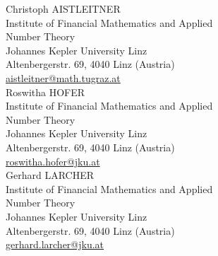 \documentclass[10pt]{article}
\newcommand{\1}{\mathbf{1}}
\begin{document}
Christoph AISTLEITNER\\
Institute of Financial Mathematics and Applied\\
Number Theory\\
Johannes Kepler University Linz\\
Altenbergerstr. 69, 4040 Linz (Austria)\\
\href{mailto:aistleitner@math.tugraz.at}{aistleitner@math.tugraz.at}\\
Roswitha HOFER\\
Institute of Financial Mathematics and Applied\\
Number Theory\\
Johannes Kepler University Linz\\
Altenbergerstr. 69, 4040 Linz (Austria)\\
\href{mailto:roswitha.hofer@jku.at}{roswitha.hofer@jku.at}\\
Gerhard LARCHER\\
Institute of Financial Mathematics and Applied\\
Number Theory\\
Johannes Kepler University Linz\\
Altenbergerstr. 69, 4040 Linz (Austria)\\
\href{mailto:gerhard.larcher@jku.at}{gerhard.larcher@jku.at}
\end{document}
